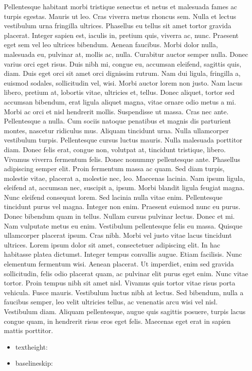 \documentclass[draft,12pt,twoside,a4paper]{book}
\begin{document}
Pellentesque habitant morbi tristique senectus et netus et malesuada fames
 ac turpis egestas.
Mauris ut leo.
Cras viverra metus rhoncus sem.
Nulla et lectus vestibulum urna fringilla ultrices.
Phasellus eu tellus sit amet tortor gravida placerat.
Integer sapien est, iaculis in, pretium quis, viverra ac, nunc.
Praesent eget sem vel leo ultrices bibendum.
Aenean faucibus.
Morbi dolor nulla, malesuada eu, pulvinar at, mollis ac, nulla.
Curabitur auctor semper nulla.
Donec varius orci eget risus.
Duis nibh mi, congue eu, accumsan eleifend, sagittis quis, diam.
Duis eget orci sit amet orci dignissim rutrum.
Nam dui ligula, fringilla a, euismod sodales, sollicitudin vel, wisi.
Morbi auctor lorem non justo.
Nam lacus libero, pretium at, lobortis vitae, ultricies et, tellus.
Donec aliquet, tortor sed accumsan bibendum, erat ligula aliquet magna,
 vitae ornare odio metus a mi.
Morbi ac orci et nisl hendrerit mollis.
Suspendisse ut massa.
Cras nec ante.
Pellentesque a nulla.
Cum sociis natoque penatibus et magnis dis parturient montes,
 nascetur ridiculus mus.
Aliquam tincidunt urna.
Nulla ullamcorper vestibulum turpis.
Pellentesque cursus luctus mauris.
Nulla malesuada porttitor diam.
Donec felis erat, congue non, volutpat at, tincidunt tristique, libero.
Vivamus viverra fermentum felis.
Donec nonummy pellentesque ante.
Phasellus adipiscing semper elit.
Proin fermentum massa ac quam.
Sed diam turpis, molestie vitae, placerat a, molestie nec, leo.
Maecenas lacinia.
Nam ipsum ligula, eleifend at, accumsan nec, suscipit a, ipsum.
Morbi blandit ligula feugiat magna.
Nunc eleifend consequat lorem.
Sed lacinia nulla vitae enim.
Pellentesque tincidunt purus vel magna.
Integer non enim.
Praesent euismod nunc eu purus.
Donec bibendum quam in tellus.
Nullam cursus pulvinar lectus.
Donec et mi.
Nam vulputate metus eu enim.
Vestibulum pellentesque felis eu massa.
Quisque ullamcorper placerat ipsum.
Cras nibh.
Morbi vel justo vitae lacus tincidunt ultrices.
Lorem ipsum dolor sit amet, consectetuer adipiscing elit.
In hac habitasse platea dictumst.
Integer tempus convallis augue.
Etiam facilisis.
Nunc elementum fermentum wisi.
Aenean placerat.
Ut imperdiet, enim sed gravida sollicitudin, felis odio placerat quam,
 ac pulvinar elit purus eget enim.
Nunc vitae tortor.
Proin tempus nibh sit amet nisl.
Vivamus quis tortor vitae risus porta vehicula.
Fusce mauris.
Vestibulum luctus nibh at lectus.
Sed bibendum, nulla a faucibus semper, leo velit ultricies tellus,
 ac venenatis arcu wisi vel nisl.
Vestibulum diam.
Aliquam pellentesque, augue quis sagittis posuere, turpis lacus congue quam,
 in hendrerit risus eros eget felis.
Maecenas eget erat in sapien mattis porttitor.

\begin{itemize}
\item textheight: \the\textheight
\item baselineskip: \the\baselineskip
\end{itemize}

\tableofcontents{}
\end{document}

